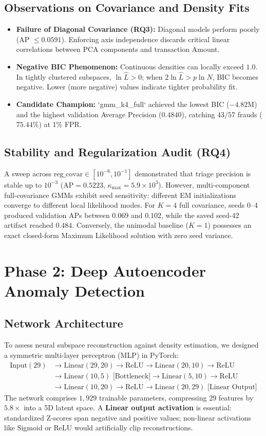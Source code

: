 \documentclass[conference]{IEEEtran}
\begin{document}
\subsection{Observations on Covariance and Density Fits}
\begin{itemize}
    \item \textbf{Failure of Diagonal Covariance (RQ3):} Diagonal models perform poorly (AP $\le 0.0591$). Enforcing axis independence discards critical linear correlations between PCA components and transaction Amount.
    \item \textbf{Negative BIC Phenomenon:} Continuous densities can locally exceed $1.0$. In tightly clustered subspaces, $\ln \hat{L} > 0$; when $2\ln\hat{L} > p\ln N$, BIC becomes negative. Lower (more negative) values indicate tighter probability fit.
    \item \textbf{Candidate Champion:} `gmm_k4_full` achieved the lowest BIC ($-4.82\text{M}$) and the highest validation Average Precision ($0.4840$), catching $43/57$ frauds ($75.44\%$) at 1\% FPR.
\end{itemize}

\subsection{Stability and Regularization Audit (RQ4)}
A sweep across $\text{reg\_covar} \in [10^{-6}, 10^{-1}]$ demonstrated that triage precision is stable up to $10^{-3}$ ($\text{AP} = 0.5223$, $\kappa_{\max} = 5.9 \times 10^3$). However, multi-component full-covariance GMMs exhibit seed sensitivity: different EM initializations converge to different local likelihood modes. For $K=4$ full covariance, seeds 0--4 produced validation APs between $0.069$ and $0.102$, while the saved seed-42 artifact reached $0.484$. Conversely, the unimodal baseline ($K=1$) possesses an exact closed-form Maximum Likelihood solution with zero seed variance.

\section{Phase 2: Deep Autoencoder Anomaly Detection}
\subsection{Network Architecture}
To assess neural subspace reconstruction against density estimation, we designed a symmetric multi-layer perceptron (MLP) in PyTorch:
\begin{align*}
\text{Input} (29) &\to \text{Linear}(29, 20) \to \text{ReLU} \to \text{Linear}(20, 10) \to \text{ReLU} \\
&\to \text{Linear}(10, 5) \text{ [Bottleneck]} \to \text{Linear}(5, 10) \to \text{ReLU} \\
&\to \text{Linear}(10, 20) \to \text{ReLU} \to \text{Linear}(20, 29) \text{ [Linear Output]}
\end{align*}
The network comprises $1,929$ trainable parameters, compressing 29 features by $5.8\times$ into a 5D latent space. A \textbf{Linear output activation} is essential: standardized Z-scores span negative and positive values; non-linear activations like Sigmoid or ReLU would artificially clip reconstructions.
\end{document}
